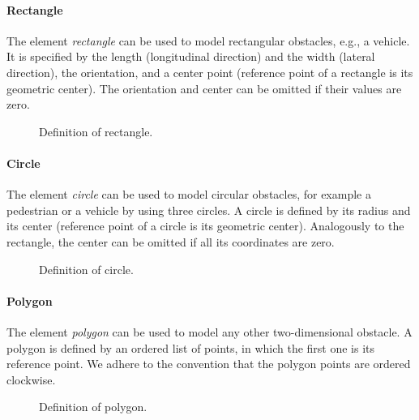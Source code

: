\paragraph{Rectangle}
The element \textit{rectangle} can be used to model rectangular obstacles, e.g., a vehicle.
It is specified by the length (longitudinal direction) and the width (lateral direction), the orientation, and a center point (reference point of a rectangle is its geometric center).
The orientation and center can be omitted if their values are zero.
\begin{figure}[!htpb]
	\small
	\caption{Definition of rectangle.}
	\label{fig:auxiliary}
\end{figure}


\paragraph{Circle}
The element \textit{circle} can be used to model circular obstacles, for example a pedestrian or a vehicle by using three circles.
A circle is defined by its radius and its center (reference point of a circle is its geometric center).
Analogously to the rectangle, the center can be omitted if all its coordinates are zero.
\begin{figure}[!htpb]
	\small
	\caption{Definition of circle.}
	\label{fig:auxiliary}
\end{figure}

\paragraph{Polygon}
The element \textit{polygon} can be used to model any other two-dimensional obstacle. 
A polygon is defined by an ordered list of points, in which the first one is its reference point. 
We adhere to the convention that the polygon points are ordered clockwise.
\begin{figure}[!htpb]
	\small
	\caption{Definition of polygon.}
	\label{fig:auxiliary}
\end{figure}



